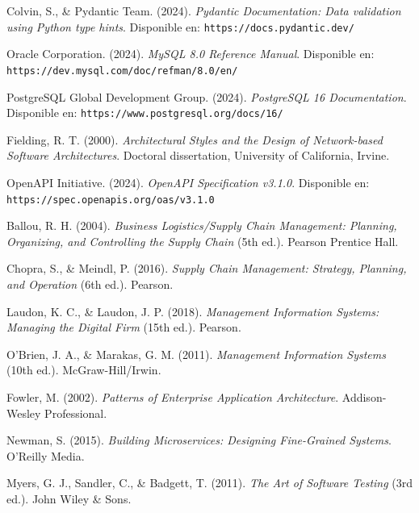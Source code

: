 \documentclass[conference]{IEEEtran}
\begin{document}
\begin{thebibliography}{20}
Colvin, S., \& Pydantic Team. (2024). \textit{Pydantic Documentation: Data validation using Python type hints}. Disponible en: \texttt{https://docs.pydantic.dev/}

Oracle Corporation. (2024). \textit{MySQL 8.0 Reference Manual}. Disponible en: \texttt{https://dev.mysql.com/doc/refman/8.0/en/}

PostgreSQL Global Development Group. (2024). \textit{PostgreSQL 16 Documentation}. Disponible en: \texttt{https://www.postgresql.org/docs/16/}

Fielding, R. T. (2000). \textit{Architectural Styles and the Design of Network-based Software Architectures}. Doctoral dissertation, University of California, Irvine.

OpenAPI Initiative. (2024). \textit{OpenAPI Specification v3.1.0}. Disponible en: \texttt{https://spec.openapis.org/oas/v3.1.0}

Ballou, R. H. (2004). \textit{Business Logistics/Supply Chain Management: Planning, Organizing, and Controlling the Supply Chain} (5th ed.). Pearson Prentice Hall.

Chopra, S., \& Meindl, P. (2016). \textit{Supply Chain Management: Strategy, Planning, and Operation} (6th ed.). Pearson.

Laudon, K. C., \& Laudon, J. P. (2018). \textit{Management Information Systems: Managing the Digital Firm} (15th ed.). Pearson.

O'Brien, J. A., \& Marakas, G. M. (2011). \textit{Management Information Systems} (10th ed.). McGraw-Hill/Irwin.

Fowler, M. (2002). \textit{Patterns of Enterprise Application Architecture}. Addison-Wesley Professional.

Newman, S. (2015). \textit{Building Microservices: Designing Fine-Grained Systems}. O'Reilly Media.

Myers, G. J., Sandler, C., \& Badgett, T. (2011). \textit{The Art of Software Testing} (3rd ed.). John Wiley \& Sons.

\end{thebibliography}
\end{document}
